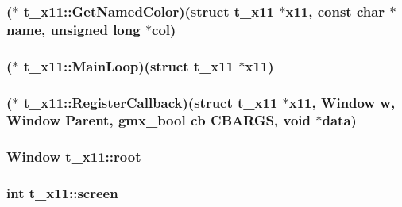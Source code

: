 \hypertarget{structt__x11_a30f4b5c0c05ceea3ec04a2110eeef455}{
\subsubsection[{\-Get\-Named\-Color}]{($\ast$ {\bf t\-\_\-x11\-::\-Get\-Named\-Color})(struct {\bf t\-\_\-x11} $\ast$x11, const char $\ast$name, unsigned long $\ast$col)}}\label{structt__x11_a30f4b5c0c05ceea3ec04a2110eeef455}
\hypertarget{structt__x11_a0e0ef020556244f7d953f092b60bbb28}{
\subsubsection[{\-Main\-Loop}]{($\ast$ {\bf t\-\_\-x11\-::\-Main\-Loop})(struct {\bf t\-\_\-x11} $\ast$x11)}}\label{structt__x11_a0e0ef020556244f7d953f092b60bbb28}
\hypertarget{structt__x11_a2d9f4f4ac23e7c23225dadabba0fd35b}{
\subsubsection[{\-Register\-Callback}]{($\ast$ {\bf t\-\_\-x11\-::\-Register\-Callback})(struct {\bf t\-\_\-x11} $\ast$x11, \-Window {\bf w}, \-Window \-Parent, {\bf gmx\-\_\-bool} {\bf cb} {\bf \-C\-B\-A\-R\-G\-S}, {\bf void} $\ast$data)}}\label{structt__x11_a2d9f4f4ac23e7c23225dadabba0fd35b}
\hypertarget{structt__x11_a7ff1559d629e530df5afe5a306b7b2e3}{
\subsubsection[{root}]{\setlength{\rightskip}{0pt plus 5cm}\-Window {\bf t\-\_\-x11\-::root}}}\label{structt__x11_a7ff1559d629e530df5afe5a306b7b2e3}
\hypertarget{structt__x11_a545c707e3904756dfc63d085272d789b}{
\subsubsection[{screen}]{\setlength{\rightskip}{0pt plus 5cm}int {\bf t\-\_\-x11\-::screen}}}\label{structt__x11_a545c707e3904756dfc63d085272d789b}
